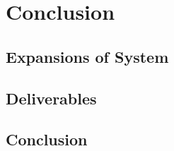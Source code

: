 \chapter{Conclusion}%
\label{conclusion}

\section{Expansions of System}

\section{Deliverables}

\section{Conclusion}

